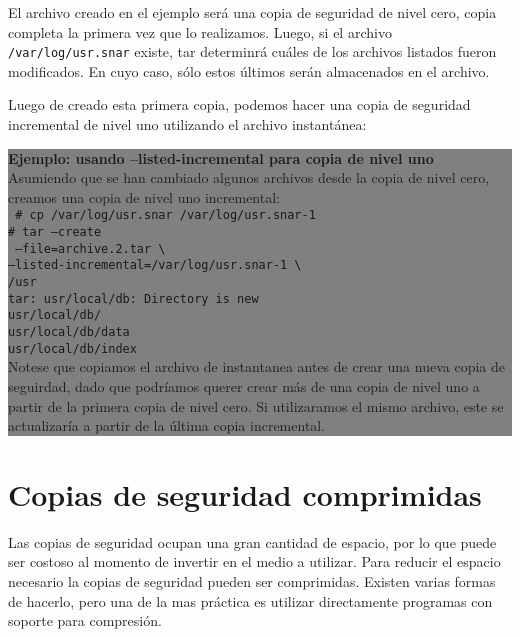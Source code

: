 \documentclass[12pt]{article}
\begin{document}
El archivo creado en el ejemplo será una copia de seguridad de nivel cero, 
copia completa la primera vez que lo realizamos. Luego, si el archivo
{\tt /var/log/usr.snar} existe, tar determinrá cuáles de los archivos 
listados fueron modificados. En cuyo caso, sólo estos últimos serán 
almacenados en el archivo. 

Luego de creado esta primera copia, podemos hacer una copia de seguridad
incremental de nivel uno utilizando el archivo instantánea: 


\colorbox{grey}{\parbox[t]{0.95\linewidth}{ \vspace*{0.5cm} { 
{\bf Ejemplo: usando --listed-incremental para copia de nivel uno } \\
Asumiendo que se han cambiado algunos archivos desde la copia de nivel 
cero, creamos una copia de nivel uno incremental: \\
{\tt
\# cp /var/log/usr.snar /var/log/usr.snar-1 	\\
\# tar --create \\\
           --file=archive.2.tar \textbackslash \\
           --listed-incremental=/var/log/usr.snar-1 \textbackslash \\
           /usr\\
tar: usr/local/db: Directory is new\\
usr/local/db/\\
usr/local/db/data\\
usr/local/db/index\\
}
Notese que copiamos el archivo de instantanea antes de crear una nueva 
copia de seguirdad, dado que podríamos querer crear más de una copia 
de nivel uno a partir de la primera copia de nivel cero. Si utilizaramos 
el mismo archivo, este se actualizaría a partir de la última copia 
incremental. 
} \vspace*{0.5cm} } } 



\section*{Copias de seguridad comprimidas}

Las copias de seguridad ocupan una gran cantidad de espacio, por lo que
puede ser costoso al momento de invertir en el medio a utilizar.
Para reducir el espacio necesario la copias de seguridad pueden ser 
comprimidas.  Existen varias formas de hacerlo, pero una de la mas práctica 
es utilizar directamente programas con soporte para compresión.
\end{document}
